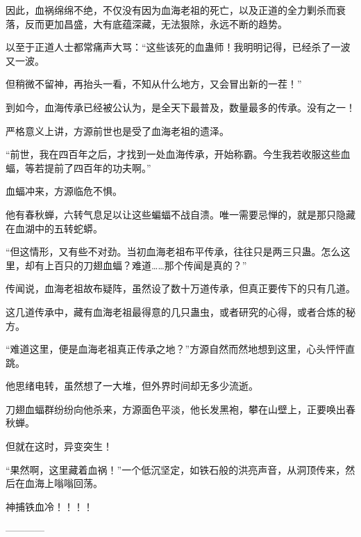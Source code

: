 \begin{this_body}
因此，血祸绵绵不绝，不仅没有因为血海老祖的死亡，以及正道的全力剿杀而衰落，反而更加昌盛，大有底蕴深藏，无法狠除，永远不断的趋势。

以至于正道人士都常痛声大骂：“这些该死的血蛊师！我明明记得，已经杀了一波又一波。

但稍微不留神，再抬头一看，不知从什么地方，又会冒出新的一茬！”

到如今，血海传承已经被公认为，是全天下最普及，数量最多的传承。没有之一！

严格意义上讲，方源前世也是受了血海老祖的遗泽。

“前世，我在四百年之后，才找到一处血海传承，开始称霸。今生我若收服这些血蝠，等若提前了四百年的功夫啊。”

血蝠冲来，方源临危不惧。

他有春秋蝉，六转气息足以让这些蝙蝠不战自溃。唯一需要忌惮的，就是那只隐藏在血湖中的五转蛇蟒。

“但这情形，又有些不对劲。当初血海老祖布平传承，往往只是两三只蛊。怎么这里，却有上百只的刀翅血蝠？难道……那个传闻是真的？”

传闻说，血海老祖故布疑阵，虽然设了数十万道传承，但真正要传下的只有几道。

这几道传承中，藏有血海老祖最得意的几只蛊虫，或者研究的心得，或者合炼的秘方。

“难道这里，便是血海老祖真正传承之地？”方源自然而然地想到这里，心头怦怦直跳。

他思绪电转，虽然想了一大堆，但外界时间却无多少流逝。

刀翅血蝠群纷纷向他杀来，方源面色平淡，他长发黑袍，攀在山壁上，正要唤出春秋蝉。

但就在这时，异变突生！

“果然啊，这里藏着血祸！”一个低沉坚定，如铁石般的洪亮声音，从洞顶传来，然后在血海上嗡嗡回荡。

神捕铁血冷！！！！

------------

\end{this_body}

